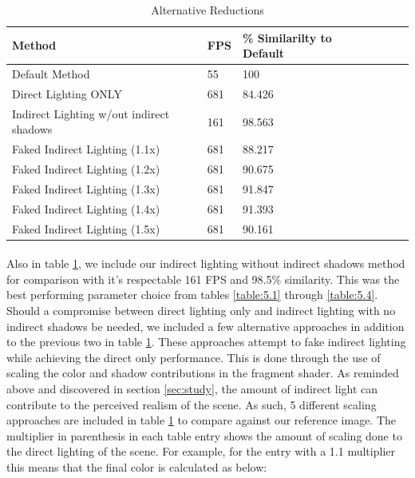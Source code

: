 \begin{table}[h!]
	\caption{Alternative Reductions}
	\begin{center}
	    \begin{tabular}{ | l | l | l | l | l | l |}
	    \hline
	    Method & FPS & \% Similarilty to Default\\ \hline
	    Default Method & 55 & 100\\ \hline
	    Direct Lighting ONLY & 681 & 84.426\\ \hline
	    Indirect Lighting w/out indirect shadows & 161 & 98.563\\ \hline
	    Faked Indirect Lighting (1.1x) & 681 & 88.217\\ \hline
	    Faked Indirect Lighting (1.2x) & 681 & 90.675\\ \hline
	    Faked Indirect Lighting (1.3x) & 681 & 91.847\\ \hline
	    Faked Indirect Lighting (1.4x) & 681 & 91.393\\ \hline
	    Faked Indirect Lighting (1.5x) & 681 & 90.161\\ \hline
	    \end{tabular}
	\end{center}
	\label{table:5.9}
\end{table}
\paragraph{}
Also in table \ref{table:5.9}, we include our indirect lighting without indirect shadows method for comparison with it's respectable 161 FPS and 98.5\% similarity.  This was the best performing parameter choice from tables \ref{table:5.1} through \ref{table:5.4}.  Should a compromise between direct lighting only and indirect lighting with no indirect shadows be needed, we included a few alternative approaches in addition to the previous two in table \ref{table:5.9}.  These approaches attempt to fake indirect lighting while achieving the direct only performance.  This is done through the use of scaling the color and shadow contributions in the fragment shader.  As reminded above and discovered in section \ref{sec:study}, the amount of indirect light can contribute to the perceived realism of the scene.  As such, 5 different scaling approaches are included in table \ref{table:5.9} to compare against our reference image.  The multiplier in parenthesis in each table entry shows the amount of scaling done to the direct lighting of the scene.  For example, for the entry with a 1.1 multiplier this means that the final color is calculated as below:

